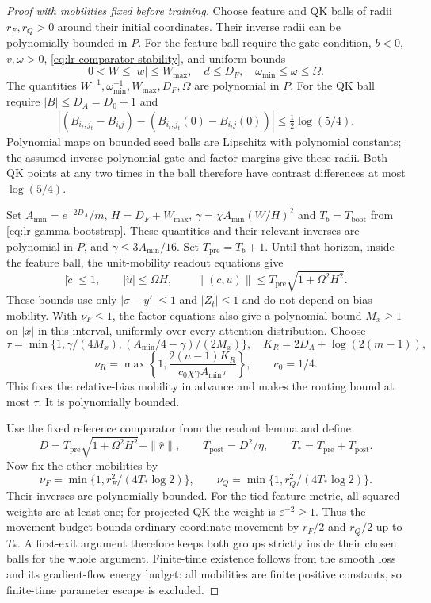 \begin{proof}[Proof with mobilities fixed before training]
Choose feature and QK balls of radii $r_F,r_Q>0$ around their initial
coordinates. Their inverse radii can be polynomially bounded in $P$.
For the feature ball require the gate condition, $b<0$, $v,\omega>0$,
\eqref{eq:lr-comparator-stability}, and uniform bounds
\[
 0<W\le|w|\le W_{\max},\quad d\le D_F,\quad
 \omega_{\min}\le\omega\le\Omega.
\]
The quantities $W^{-1},\omega_{\min}^{-1},W_{\max},D_F,\Omega$ are
polynomial in $P$. For the QK ball require $|B|\le D_A=D_0+1$ and
\[
 |(B_{i_t,j_t}-B_{i_tj})-(B_{i_t,j_t}(0)-B_{i_tj}(0))|
 \le\tfrac12\log(5/4).
\]
Polynomial maps on bounded seed balls are Lipschitz with polynomial
constants; the assumed inverse-polynomial gate and factor margins give
these radii. Both QK points at any two times in the ball therefore have
contrast differences at most $\log(5/4)$.

Set $A_{\min}=e^{-2D_A}/m$, $H=D_F+W_{\max}$,
$\gamma=\chi A_{\min}(W/H)^2$ and $T_b=T_{\mathrm{boot}}$ from
\eqref{eq:lr-gamma-bootstrap}. These quantities and their relevant
inverses are polynomial in $P$, and $\gamma\le3A_{\min}/16$.
Set $T_{\mathrm{pre}}=T_b+1$. Until that horizon, inside the feature
ball, the unit-mobility readout equations give
\[
 |\dot c|\le1,\qquad |\dot u|\le\Omega H,
 \qquad \|(c,u)\|\le T_{\mathrm{pre}}\sqrt{1+\Omega^2H^2}.
\]
These bounds use only $|\sigma-y'|\le1$ and $|Z_t|\le1$ and do not
depend on bias mobility. With $\nu_F\le1$, the factor equations also
give a polynomial bound $M_x\ge1$ on $|\dot x|$ in this interval,
uniformly over every attention distribution. Choose
\[
 \tau=\min\{1,\gamma/(4M_x),(A_{\min}/4-\gamma)/(2M_x)\},
 \quad K_R=2D_A+\log(2(m-1)),
\]
\[
 \nu_R=\max\left\{1,
 \frac{2(n-1)K_R}{c_0\chi\gamma A_{\min}\tau}\right\},
 \qquad c_0=1/4.
\]
This fixes the relative-bias mobility in advance and makes the routing
bound at most $\tau$. It is polynomially bounded.

Use the fixed reference comparator from the readout lemma and define
\[
 D=T_{\mathrm{pre}}\sqrt{1+\Omega^2H^2}+\|\widehat r\|,
 \qquad T_{\mathrm{post}}=D^2/\eta,\qquad
 T_*=T_{\mathrm{pre}}+T_{\mathrm{post}}.
\]
Now fix the other mobilities by
\[
 \nu_F=\min\{1,r_F^2/(4T_*\log2)\},\qquad
 \nu_Q=\min\{1,r_Q^2/(4T_*\log2)\}.
\]
Their inverses are polynomially bounded. For the tied feature metric,
all squared weights are at least one; for projected QK the weight is
$\varepsilon^{-2}\ge1$. Thus the movement budget bounds ordinary
coordinate movement by $r_F/2$ and $r_Q/2$ up to $T_*$.
A first-exit argument therefore keeps both groups strictly inside their
chosen balls for the whole argument. Finite-time existence follows from
the smooth loss and its gradient-flow energy budget: all mobilities are
finite positive constants, so finite-time parameter escape is excluded.


\end{proof}
